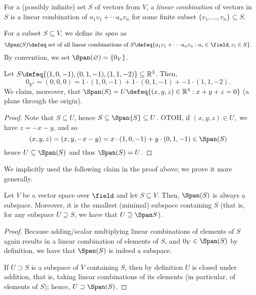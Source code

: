 \begin{definition}
    For a (possibly infinite) set $S$ of vectors from $V$, a \emph{linear combination} of vectors in $S$ is a linear combination of $a_1 v_1 + \cdots a_n v_n$ for some finite subset $\{v_1, \dots, v_n\} \subseteq S$.\footnotemark
\end{definition}

\begin{definition}[Span]
    For a subset $S \subseteq V$, we define its \emph{span} as \[
    \Span(S)\defeq \text{ set of all linear combinations of } S \defeq \{a_1 v_1 + \cdots a_n v_n : a_i \in \field, v_i \in S\}.    
    \]
    By convention, we set $\Span(\varnothing) = \{0_V\}$.
\end{definition}
\begin{example}
    Let $S \defeq \{(1, 0, -1), (0, 1, -1), (1, 1, -2)\} \subseteq \mathbb{R}^3$. Then, \[
    0_{\mathbb{R}^3} =(0,0,0) = 1 \cdot (1, 0, -1) + 1 \cdot (0, 1, -1) + -1 \cdot (1, 1, -2).
    \]
    We claim, moreover, that $\Span (S) = U \defeq \{(x, y, z) \in \mathbb{R}^3 : x+y+z = 0\}$ (a plane through the origin).
    \begin{proof}
        Note that $S \subseteq U$, hence $S \subseteq \Span{S} \subseteq U$. OTOH, if $(x, y, z) \in U, $ we have $z = - x - y$, and so \[
        (x, y, z) = (x, y, -x - y) = x\cdot (1, 0, -1) + y \cdot (0, 1, -1) \in \Span (S)    
        \]
        hence $U \subseteq \Span (S)$ and thus $\Span (S) = U$.
    \end{proof}
\end{example}

\begin{remark}
    We implicitly used the following claim in the proof above; we prove it more generally.
\end{remark}
\begin{proposition}
    Let $V$ be a vector space over $\field$ and let $S \subseteq V$. Then, $\Span (S)$ is always a subspace. Moreover, it is the smallest (minimal) subspace containing $S$ (that is, for any subspace $U \supseteq S$, we have that $U \supseteq \Span S$).
\end{proposition}

\begin{proof}
    Because adding/scalar multiplying linear combinations of elements of $S$ again results in a linear combination of elements of $S$, and $0_V \in \Span (S)$ by definition, we have that $\Span (S)$ is indeed a subspace.

    If $U \supset S$ is a subspace of $V$ containing $S$, then by definition $U$ is closed under addition, that is, taking linear combinations of its elements (in particular, of elements of $S$); hence, $U \supset \Span (S)$.
\end{proof}

